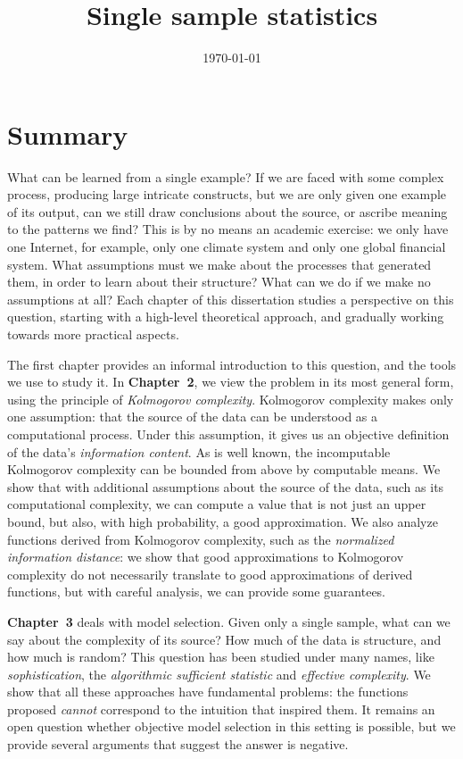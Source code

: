 \documentclass{thesis}
\title{Single sample statistics}
\date{\today}
\theoremstyle{definition}
\begin{document}
\maketitle

\tableofcontents

\chapter{Summary}
\noindent What can be learned from a single example? If we are faced with some complex process, producing large intricate constructs, but we are only given one example of its output, can we still draw conclusions about the source, or ascribe meaning to the patterns we find? This is by no means an academic exercise: we only have one Internet, for example, only one climate system and only one global financial system. What assumptions must we make about the processes that generated them, in order to learn about their structure? What can we do if we make no assumptions at all? Each chapter of this dissertation studies a perspective on this question, starting with a high-level theoretical approach, and gradually working towards more practical aspects. 

The first chapter provides an informal introduction to this question, and the tools we use to study it. In \textbf{Chapter~2}, we view the problem in its most general form, using the principle of \emph{Kolmogorov complexity}. Kolmogorov complexity makes only one assumption: that the source of the data can be understood as a computational process. Under this assumption, it gives us an objective definition of the data's \emph{information content}. As is well known, the incomputable Kolmogorov complexity can be bounded from above by computable means. We show that with additional assumptions about the source of the data, such as its computational complexity, we can compute a value that is not just an upper bound, but also, with high probability, a good approximation. We also analyze functions derived from Kolmogorov complexity, such as the \emph{normalized information distance}: we show that good approximations to Kolmogorov complexity do not necessarily translate to good approximations of derived functions, but with careful analysis, we can provide some guarantees.

\textbf{Chapter~3} deals with model selection. Given only a single  sample, what can we say about the complexity of its source? How much of the data is structure, and how much is random? This question has been studied under many names, like \emph{sophistication}, the \emph{algorithmic sufficient statistic} and  \emph{effective complexity}. We show that all these approaches have fundamental problems: the functions proposed \emph{cannot} correspond to the intuition that inspired them. It remains an open question whether objective model selection in this setting is possible, but we provide several arguments that suggest the answer is negative.
\end{document}
